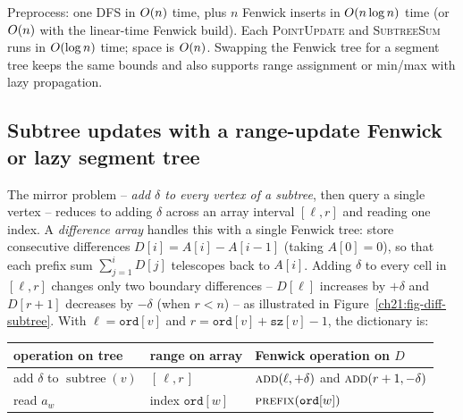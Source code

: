 \begin{complexitybox}
Preprocess: one DFS in $O(n)$ time, plus $n$ Fenwick inserts in $O(n\log n)$ time (or $O(n)$
with the linear-time Fenwick build). Each \textsc{PointUpdate} and \textsc{SubtreeSum} runs in
$O(\log n)$ time; space is $O(n)$. Swapping the Fenwick tree for a segment tree keeps the
same bounds and also supports range assignment or min/max with lazy propagation.
\end{complexitybox}

\subsection{Subtree updates with a range-update Fenwick or lazy segment tree}

The mirror problem -- \emph{add $\delta$ to every vertex of a subtree}, then query a
single vertex -- reduces to adding $\delta$ across an array interval $[\ell, r]$ and reading one index. A \emph{difference array} handles this with a single Fenwick tree: store consecutive differences $D[i] = A[i] - A[i-1]$ (taking $A[0]=0$), so that each prefix sum $\sum_{j=1}^{i} D[j]$ telescopes back to $A[i]$. Adding $\delta$ to every cell in $[\ell, r]$ changes only two boundary differences -- $D[\ell]$ increases by $+\delta$ and $D[r+1]$ decreases by $-\delta$ (when $r < n$) -- as illustrated in Figure~\ref{ch21:fig-diff-subtree}. With $\ell = \texttt{ord}[v]$ and $r = \texttt{ord}[v]+\texttt{sz}[v]-1$, the dictionary is:

\begin{center}
\begin{tabular}{lll}
\toprule
operation on tree & range on array & Fenwick operation on $D$\\
\midrule
add $\delta$ to $\operatorname{subtree}(v)$ & $[\,\ell,r\,]$ & $\textsc{add}(\ell,+\delta)$ and $\textsc{add}(r+1,-\delta)$\\
read $a_w$ & index $\texttt{ord}[w]$ & $\textsc{prefix}(\texttt{ord}[w])$\\
\bottomrule
\end{tabular}
\end{center}


